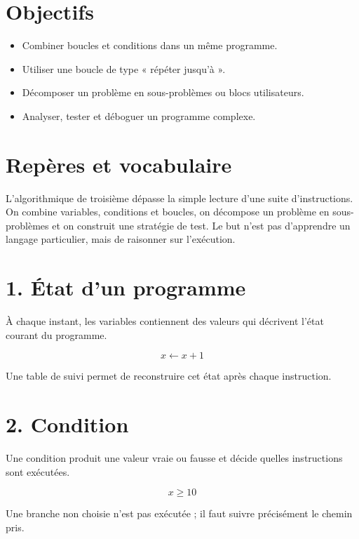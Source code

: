 
\section{Objectifs}
\begin{itemize}
\item Combiner boucles et conditions dans un même programme.
\item Utiliser une boucle de type « répéter jusqu’à ».
\item Décomposer un problème en sous-problèmes ou blocs utilisateurs.
\item Analyser, tester et déboguer un programme complexe.
\end{itemize}

\section{Repères et vocabulaire}
L’algorithmique de troisième dépasse la simple lecture d’une suite d’instructions. On combine variables, conditions et boucles, on décompose un problème en sous-problèmes et on construit une stratégie de test. Le but n’est pas d’apprendre un langage particulier, mais de raisonner sur l’exécution.

\section{1. État d’un programme}
À chaque instant, les variables contiennent des valeurs qui décrivent l’état courant du programme.

\[
x\leftarrow x+1
\]

\begin{exemple}
Une table de suivi permet de reconstruire cet état après chaque instruction.
\end{exemple}

\section{2. Condition}
Une condition produit une valeur vraie ou fausse et décide quelles instructions sont exécutées.

\[
x\ge10
\]

\begin{exemple}
Une branche non choisie n’est pas exécutée ; il faut suivre précisément le chemin pris.
\end{exemple}

